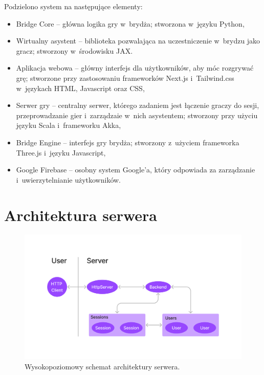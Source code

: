 Podzielono system na następujące elementy:
\begin{itemize}
  \item Bridge Core -- główna logika gry w~brydża; stworzona
        w~języku Python,

  \item Wirtualny asystent -- biblioteka pozwalająca na uczestniczenie
        w~brydzu jako gracz; stworzony w~środowisku JAX.

  \item Aplikacja webowa -- główny interfejs dla użytkowników,
        aby móc rozgrywać grę; stworzone przy zastosowaniu
        frameworków Next.js i~Tailwind.css w~językach HTML, \mbox{Javascript}
        oraz CSS,

  \item Serwer gry -- centralny serwer, którego zadaniem jest
        łączenie graczy do sesji, przeprowadzanie gier i~zarządzaie
        w~nich asystentem; stworzony przy użyciu języku Scala
        \mbox{i~frameworku} Akka,

  \item Bridge Engine -- interfejs gry brydża; stworzony
        z~użyciem frameworka Three.js i~języku Javascript,

  \item Google Firebase -- osobny system Google'a, który
        odpowiada za zarządzanie i~uwierzytelnianie użytkowników.
\end{itemize}


\FloatBarrier


\section{Architektura serwera}

\begin{figure}[!]
  \centering
  \includegraphics[width=\textwidth]{img/akka/HighLevel.png}
  \caption{Wysokopoziomowy schemat architektury serwera.}
  \label{fig:akka-highlevel}
\end{figure}

